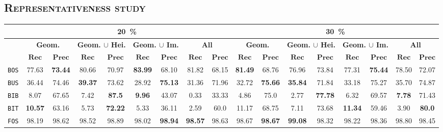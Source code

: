     \subsection{\textsc{Representativeness study}}
        \begin{sidewaystable}
            \footnotesize
            \begin{center}
                \begin{tabular}{|c | c c | c c | c c | c c || c c | c c | c c | c c |}
                    \hline
                    & \multicolumn{8}{c||}{\textbf{\SI{20}{\percent}}} & \multicolumn{8}{c|}{\textbf{\SI{30}{\percent}}}\\
                    \hline
                    &\multicolumn{2}{c|}{\textbf{Geom.}} & \multicolumn{2}{c|}{\textbf{Geom. $\cup$ Hei.}} & \multicolumn{2}{c|}{\textbf{Geom. $\cup$ Im.}} & \multicolumn{2}{c||}{\textbf{All}} & \multicolumn{2}{c|}{\textbf{Geom.}} & \multicolumn{2}{c|}{\textbf{Geom. $\cup$ Hei.}} & \multicolumn{2}{c|}{\textbf{Geom. $\cup$ Im.}} & \multicolumn{2}{x{1.5cm}|}{\textbf{All}}\\
                    \cline{2-17}
                    & $\bm{Rec}$ & $\bm{Prec}$ &  $\bm{Rec}$ & $\bm{Prec}$ &  $\bm{Rec}$ & $\bm{Prec}$ &  $\bm{Rec}$ & $\bm{Prec}$ & $\bm{Rec}$ & $\bm{Prec}$ &  $\bm{Rec}$ & $\bm{Prec}$ &  $\bm{Rec}$ & $\bm{Prec}$ &  $\bm{Rec}$ & $\bm{Prec}$ \\
                    \hline
                    \texttt{BOS} & 77.63 & \textbf{73.44} & 80.66 & 70.97 & \textbf{83.99} & 68.10 & 81.82 & 68.15 & \textbf{81.49} & 68.76 & 76.96 & 73.84 & 77.31 & \textbf{75.44} & 78.50 & 72.07 \\
                    \hline
                    \texttt{BUS} & 36.44 & 74.46 & \textbf{39.37} & 73.62 & 28.92 & \textbf{75.13} & 31.36 & 71.96 & 32.72 & \textbf{75.66} & \textbf{35.84} & 71.84 & 33.18 & 75.27 & 35.70 & 74.87 \\
                    \hline
                    \texttt{BIB} & 8.07 & 67.65 & 7.42 & \textbf{87.5} & \textbf{9.96} & 43.07 & 0.33 & 33.33 & 4.86 & 75.0 & 2.77 & \textbf{77.78} & 6.32 & 69.57 & \textbf{7.78} & 71.43 \\
                    \hline
                    \texttt{BIT} & \textbf{10.57} & 63.16 & 5.73 & \textbf{72.22} & 5.33 & 36.11 & 2.59 & 60.0 & 11.17 & 68.75 & 7.11 & 73.68 & \textbf{11.34} & 59.46 & 3.90 & \textbf{80.0} \\
                    \hline
                    \texttt{FOS} & 98.19 & 98.62 & 98.52 & 98.89 & 98.02 & \textbf{98.94} & \textbf{98.57} & 98.63 & 98.67 & \textbf{98.67} & \textbf{99.08} & 98.32 & 98.22 & 98.36 & 98.80 & 98.45 \\

\end{tabular}
\end{center}
\end{sidewaystable}
